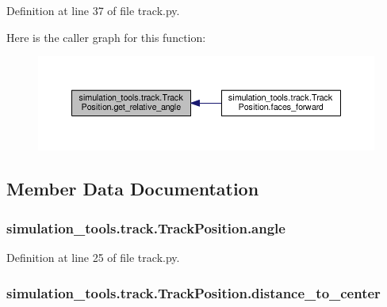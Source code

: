 Definition at line 37 of file track.\+py.



Here is the caller graph for this function\+:
\nopagebreak
\begin{figure}[H]
\begin{center}
\leavevmode
\includegraphics[width=350pt]{classsimulation__tools_1_1track_1_1_track_position_ae4cf3681d7edde291e3c566cfb21397a_icgraph}
\end{center}
\end{figure}




\subsection{Member Data Documentation}
\subsubsection[{\texorpdfstring{angle}{angle}}]{\setlength{\rightskip}{0pt plus 5cm}simulation\+\_\+tools.\+track.\+Track\+Position.\+angle}\hypertarget{classsimulation__tools_1_1track_1_1_track_position_a4809c7245ab044b2b3ca96fbdc80fe72}{}\label{classsimulation__tools_1_1track_1_1_track_position_a4809c7245ab044b2b3ca96fbdc80fe72}


Definition at line 25 of file track.\+py.

\subsubsection[{\texorpdfstring{distance\+\_\+to\+\_\+center}{distance_to_center}}]{\setlength{\rightskip}{0pt plus 5cm}simulation\+\_\+tools.\+track.\+Track\+Position.\+distance\+\_\+to\+\_\+center}\hypertarget{classsimulation__tools_1_1track_1_1_track_position_a1d45644ad2113e0c7a8e546f52015d46}{}\label{classsimulation__tools_1_1track_1_1_track_position_a1d45644ad2113e0c7a8e546f52015d46}


